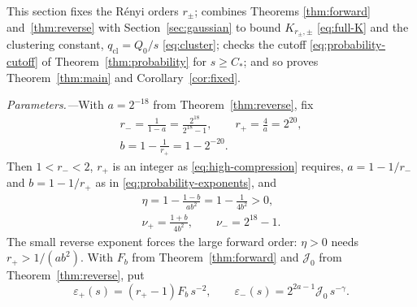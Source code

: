 \documentclass[aps,prl,reprint,longbibliography,raggedbottom]{revtex4-2}
\begin{document}
This section fixes the R\'enyi orders $r_\pm$; combines
Theorems \ref{thm:forward} and~\ref{thm:reverse} with
Section~\ref{sec:gaussian} to bound $K_{r_\pm,\pm}$
\eqref{eq:full-K} and the clustering constant, $q_{\mathrm{cl}}=Q_0/s$
\eqref{eq:cluster}; checks the cutoff \eqref{eq:probability-cutoff} of
Theorem~\ref{thm:probability} for $s\ge C_*$; and so proves
Theorem~\ref{thm:main} and Corollary~\ref{cor:fixed}.

\emph{Parameters.---}With $a=2^{-18}$ from Theorem~\ref{thm:reverse},
fix
\begin{equation}
\begin{gathered}
r_-=\frac1{1-a}=\frac{2^{18}}{2^{18}-1},\qquad
r_+=\frac4a=2^{20},\\
b=1-\frac1{r_+}=1-2^{-20}.
\end{gathered}
\label{eq:orders}
\end{equation}
Then $1<r_-<2$, $r_+$ is an integer as \eqref{eq:high-compression}
requires, $a=1-1/r_-$ and $b=1-1/r_+$ as in
\eqref{eq:probability-exponents}, and
\begin{equation}
\begin{gathered}
\eta=1-\frac{1-b}{ab^2}=1-\frac1{4b^2}>0,\\
\nu_+=\frac{1+b}{4b^2},\qquad \nu_-=2^{18}-1 .
\end{gathered}
\label{eq:completion-exponents}
\end{equation}
The small reverse exponent forces the large forward order: $\eta>0$
needs $r_+>1/(ab^2)$. With $F_b$ from Theorem~\ref{thm:forward} and
$\mathcal J_0$ from Theorem~\ref{thm:reverse}, put
\begin{equation}
\varepsilon_+(s)=(r_+-1)F_b\,s^{-2},\qquad
\varepsilon_-(s)=2^{2a-1}\mathcal J_0\,s^{-\gamma}.
\label{eq:envelopes}
\end{equation}
\end{document}
